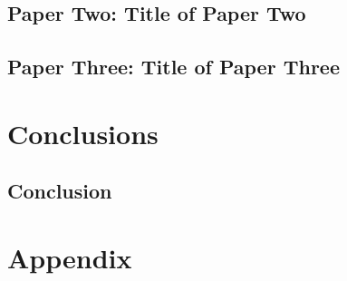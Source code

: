 \documentclass[%
  11pt,               %
  a4paper,            %
  twoside,            %
  openright,          %
  titlepage,          %
  headinclude,        %
  footinclude,        %
  BCOR=5mm,           %
  DIV=calc,           %
  numbers=noenddot    %
]{scrreprt}
\begin{document}
\chapter{Paper Two: Title of Paper Two}
\lipsum[5-6] %

\chapter{Paper Three: Title of Paper Three}
\lipsum[7-8] %

\part{Conclusions}\label{pt:conclusions}
\chapter{Conclusion}
\lipsum[9-10] %


\appendix
\cleardoublepage
\part{Appendix}
\def\dir{chapters/99-A-appendix}


\cleardoublepage
{}
\cleardoublepage
\cleardoublepage
\end{document}

